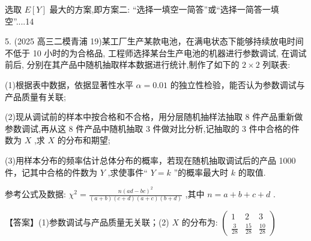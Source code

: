 \documentclass[10pt]{article}
\begin{document}
选取 \(E\left\lbrack  Y\right\rbrack\) 最大的方案,即方案二: “选择一填空一简答”或“选择一简答一填空”....14

5. (2025 高三二模青浦 19)某工厂生产某款电池，在满电状态下能够持续放电时间不低于 10 小时的为合格品, 工程师选择某台生产电池的机器进行参数调试, 在调试前后, 分别在其产品中随机抽取样本数据进行统计,制作了如下的 \(2 \times  2\) 列联表:

\begin{center}
\end{center}

(1)根据表中数据，依据显著性水平 \(\alpha  = {0.01}\) 的独立性检验，能否认为参数调试与产品质量有关联;

(2)现从调试前的样本中按合格和不合格，用分层随机抽样法抽取 8 件产品重新做参数调试,再从这 8 件产品中随机抽取 3 件做对比分析,记抽取的 3 件中合格的件数为 \(X\) ,求 \(X\) 的分布和期望;

(3)用样本分布的频率估计总体分布的概率，若现在随机抽取调试后的产品 1000 件，记其中合格的件数为 \(Y\) ,求使事件“ \(Y = k\) ”的概率最大时 \(k\) 的取值.

参考公式及数据: \({\chi }^{2} = \frac{n{\left( ad - bc\right) }^{2}}{\left( {a + b}\right) \left( {c + d}\right) \left( {a + c}\right) \left( {b + d}\right) }\) ,其中 \(n = a + b + c + d\) .

\begin{center}
\end{center}

【答案】(1)参数调试与产品质量无关联；(2) \(X\) 的分布为: \(\left( \begin{matrix} 1 & 2 & 3 \\  \frac{3}{28} & \frac{15}{28} & \frac{10}{28} \end{matrix}\right)\)
\end{document}
